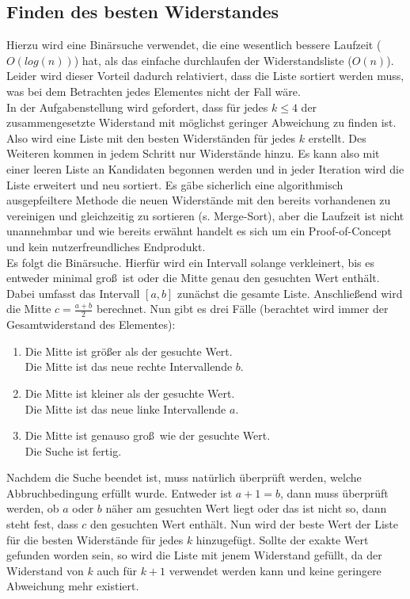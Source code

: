 \documentclass[a4paper,10pt,ngerman]{scrartcl}
\begin{document}
\subsection{Finden des besten Widerstandes}
Hierzu wird eine Bin\"arsuche verwendet, die eine wesentlich bessere
Laufzeit ($O(log(n))$) hat, als das einfache durchlaufen der
Widerstandsliste ($O(n)$). Leider wird dieser Vorteil dadurch relativiert,
dass die Liste sortiert werden muss, was bei dem Betrachten jedes
Elementes nicht der Fall w\"are.\\
\indent In der Aufgabenstellung wird gefordert, dass f\"ur jedes
$k \leq 4$ der zusammengesetzte Widerstand mit m\"oglichst geringer
Abweichung zu finden ist. Also wird eine Liste mit den besten Widerst\"anden
f\"ur jedes $k$ erstellt. Des Weiteren kommen in jedem Schritt nur Widerst\"ande
hinzu. Es kann also mit einer leeren Liste an Kandidaten begonnen werden und
in jeder Iteration wird die Liste erweitert und neu sortiert.
Es g\"abe sicherlich eine algorithmisch ausgepfeiltere Methode die neuen
Widerst\"ande mit den bereits vorhandenen zu vereinigen und gleichzeitig
zu sortieren (s. Merge-Sort), aber die Laufzeit ist nicht unannehmbar und
wie bereits erw\"ahnt handelt es sich um ein Proof-of-Concept und kein
nutzerfreundliches Endprodukt.\\
\indent Es folgt die Bin\"arsuche. Hierf\"ur wird ein Intervall solange
verkleinert, bis es entweder minimal gro\ss\ ist oder die Mitte genau
den gesuchten Wert enth\"alt. Dabei umfasst das Intervall $[a, b]$ zun\"achst
die gesamte Liste. Anschlie\ss end wird die Mitte $c=\frac{a+b}{2}$ berechnet.
Nun gibt es drei F\"alle (berachtet wird immer der Gesamtwiderstand des
Elementes):
\begin{enumerate}
  \item Die Mitte ist gr\"o\ss er als der gesuchte Wert.\\
        \Rightarrow Die Mitte ist das neue rechte Intervallende $b$.
  \item Die Mitte ist kleiner als der gesuchte Wert. \\
        \Rightarrow Die Mitte ist das neue linke Intervallende $a$.
  \item Die Mitte ist genauso gro\ss\ wie der gesuchte Wert.\\
        \Rightarrow Die Suche ist fertig.
\end{enumerate}
Nachdem die Suche beendet ist, muss nat\"urlich \"uberpr\"uft werden, welche
Abbruchbedingung erf\"ullt wurde. Entweder ist $a+1=b$, dann muss \"uberpr\"uft
werden, ob $a$ oder $b$ n\"aher am gesuchten Wert liegt oder das ist nicht so,
dann steht fest, dass $c$ den gesuchten Wert enth\"alt. Nun wird der beste
Wert der Liste f\"ur die besten Widerst\"ande f\"ur jedes $k$ hinzugef\"ugt. 
Sollte der exakte Wert gefunden worden sein, so wird die Liste mit jenem
Widerstand gef\"ullt, da der Widerstand von $k$ auch f\"ur $k+1$ verwendet
werden kann und keine geringere Abweichung mehr existiert. 
\end{document}

